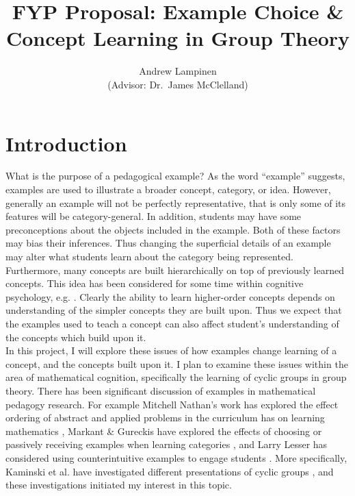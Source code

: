\documentclass[11pt]{article}
\begin{document}
\title{FYP Proposal: Example Choice \& Concept Learning in Group Theory}
\author{Andrew Lampinen \\ (Advisor: Dr.\ James McClelland)}
\date{}
\maketitle
\section{Introduction}
What is the purpose of a pedagogical example? As the word ``example'' suggests, examples are used to illustrate a broader concept, category, or idea. However, generally an example will not be perfectly representative, that is only some of its features will be category-general. In addition, students may have some preconceptions about the objects included in the example. Both of these factors may bias their inferences. Thus changing the superficial details of an example may alter what students learn about the category being represented. \\[11pt]
Furthermore, many concepts are built hierarchically on top of previously learned concepts. This idea has been considered for some time within cognitive psychology, e.g. \cite{Fischer1980}. Clearly the ability to learn higher-order concepts depends on understanding of the simpler concepts they are built upon. Thus we expect that the examples used to teach a concept can also affect student's understanding of the concepts which build upon it.\\[11pt]
In this project, I will explore these issues of how examples change learning of a concept, and the concepts built upon it. I plan to examine these issues within the area of mathematical cognition, specifically the learning of cyclic groups in group theory. There has been significant discussion of examples in mathematical pedagogy research. For example Mitchell Nathan's work has explored the effect ordering of abstract and applied problems in the curriculum has on learning mathematics \cite{Nathan2012}, Markant \& Gureckis have explored the effects of choosing or passively receiving examples when learning categories \cite{Markant2014}, and Larry Lesser has considered using counterintuitive examples to engage students \cite{Lesser1998}. More specifically, Kaminski et al. have investigated different presentations of cyclic groups \cite{Kaminski2008}, and these investigations initiated my interest in this topic. 
\end{document}
